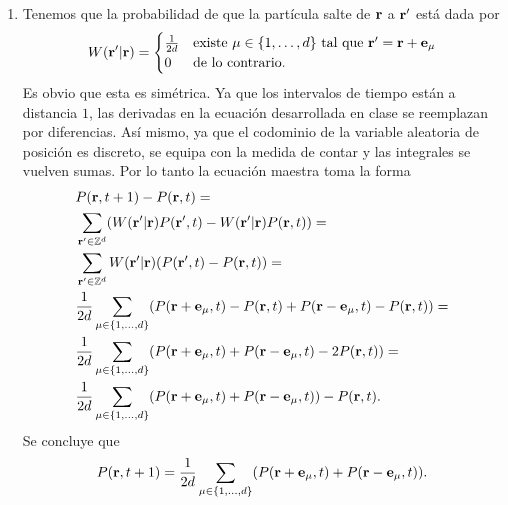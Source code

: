 \documentclass{article}
\begin{document}
\begin{enumerate}

\item Tenemos que la probabilidad de que la partícula salte de $\vb{r}$ a $\vb{r}'$ está dada por
\begin{equation}
W(\vb{r}'|\vb{r})=\begin{cases}
\frac{1}{2d} & \text{existe }\mu\in\{1,\dots,d\}\text{ tal que }\vb{r}'=\vb{r}+\vb{e}_\mu\\
0 & \text{de lo contrario}. 
\end{cases}
\end{equation}
Es obvio que esta es simétrica. Ya que los intervalos de tiempo están a distancia $1$, las derivadas en la ecuación desarrollada en clase se reemplazan por diferencias. Así mismo, ya que el codominio de la variable aleatoria de posición es discreto, se equipa con la medida de contar y las integrales se vuelven sumas. Por lo tanto la ecuación maestra toma la forma
\begin{align}
\begin{split}
&P(\vb{r},t+1)-P(\vb{r},t)=\\
&\sum_{\vb{r}'\in\mathbb{Z}^d}(W(\vb{r}'|\vb{r})P(\vb{r}',t)-W(\vb{r}'|\vb{r})P(\vb{r},t))=\\
&\sum_{\vb{r}'\in\mathbb{Z}^d}W(\vb{r}'|\vb{r})(P(\vb{r}',t)-P(\vb{r},t))=\\
&\frac{1}{2d}\sum_{\mu\in\{1,\dots,d\}}(P(\vb{r}+\vb{e}_\mu,t)-P(\vb{r},t)+P(\vb{r}-\vb{e}_\mu,t)-P(\vb{r},t))=\\
&\frac{1}{2d}\sum_{\mu\in\{1,\dots,d\}}(P(\vb{r}+\vb{e}_\mu,t)+P(\vb{r}-\vb{e}_\mu,t)-2P(\vb{r},t))=\\
&\frac{1}{2d}\sum_{\mu\in\{1,\dots,d\}}(P(\vb{r}+\vb{e}_\mu,t)+P(\vb{r}-\vb{e}_\mu,t))-P(\vb{r},t).
\end{split}
\end{align}
Se concluye que
\begin{equation}\label{ec:maestra}
P(\vb{r},t+1)=\frac{1}{2d}\sum_{\mu\in\{1,\dots,d\}}(P(\vb{r}+\vb{e}_\mu,t)+P(\vb{r}-\vb{e}_\mu,t)).
\end{equation}


\end{enumerate}
\end{document}
